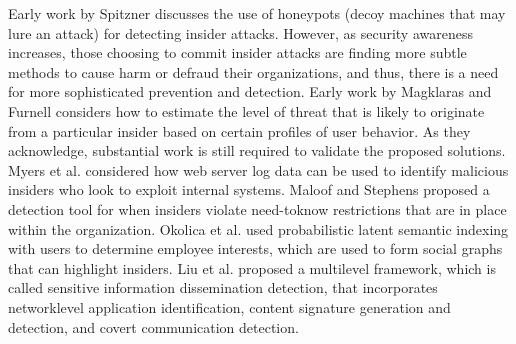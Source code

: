 \documentclass[conference]{IEEEtran}
\begin{document}
Early work by Spitzner \cite{b23} discusses the use of honeypots (decoy machines that may lure an attack) for detecting insider attacks. However, as security awareness increases, those choosing to commit insider attacks are finding more subtle methods to cause harm or defraud their organizations, and thus, there is a need for more sophisticated prevention and detection. Early work by Magklaras and Furnell \cite{b24} considers how to estimate the level of threat that is likely to originate from a particular insider based on certain profiles of user behavior. As they acknowledge, substantial work is still required to validate the proposed solutions. Myers et al.\cite{b25}  considered how web server log data can be used to identify malicious insiders who look to exploit internal systems. Maloof and Stephens \cite{b26} proposed a detection tool for when insiders violate need-toknow restrictions that are in place within the organization. Okolica et al. \cite{b27} used probabilistic latent semantic indexing with users to determine employee interests, which are used to form social graphs that can highlight insiders. Liu et al. \cite{b28} proposed a multilevel framework, which is called sensitive information dissemination detection, that incorporates networklevel application identification, content signature generation and detection, and covert communication detection.
\end{document}
